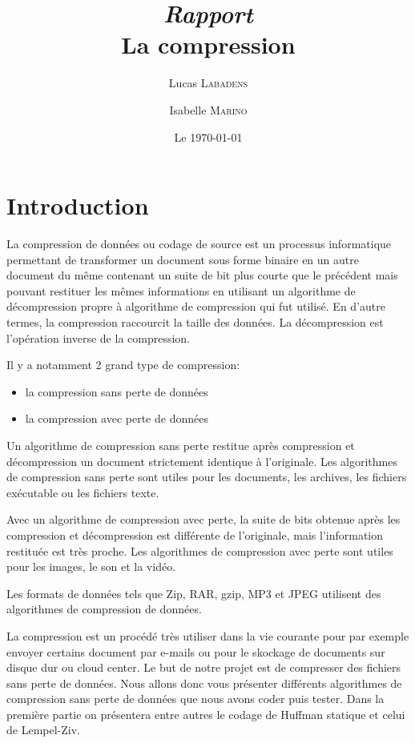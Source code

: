 \documentclass{report}
\title{\textit{Rapport} \\ La compression}
\author{Lucas \textsc{Labadens} \and Isabelle \textsc{Marino} }
\date{Le \today}
\begin{document}
\maketitle
 

\section*{Introduction}
La compression de données ou codage de source est un processus informatique permettant de transformer un document sous forme binaire en un autre document du même contenant un suite de bit plus courte que le précédent mais pouvant restituer les mêmes informations en utilisant un algorithme de décompression propre à algorithme de compression qui fut utilisé. En d'autre termes, la compression raccourcit la taille des données. La décompression est l'opération inverse de la compression.

Il y a notamment 2 grand type de compression:
\begin{itemize}
\item la compression sans perte de données
\item la compression avec perte de données
\end{itemize}

Un algorithme de compression sans perte restitue après compression et décompression un document strictement identique à l'originale. Les algorithmes de compression sans perte sont utiles pour les documents, les archives, les fichiers exécutable ou les fichiers texte.

Avec un algorithme de compression avec perte, la suite de bits obtenue après les  compression et décompression est différente de l'originale, mais l'information restituée est très proche. Les algorithmes de compression avec perte sont utiles pour les images, le son et la vidéo.

Les formats de données tels que Zip, RAR, gzip, MP3 et JPEG utilisent des algorithmes de compression de données.

La compression est un procédé très utiliser dans la vie courante pour par exemple envoyer certains document par e-mails ou pour le skockage de documents sur disque dur ou cloud center.  
Le but de notre projet est de compresser des fichiers sans perte de données. 
Nous allons donc vous présenter différents algorithmes de compression sans perte de données que nous avons coder puis tester.
Dans la première partie on présentera entre autres le codage de Huffman statique et celui de Lempel-Ziv. 
\end{document}
